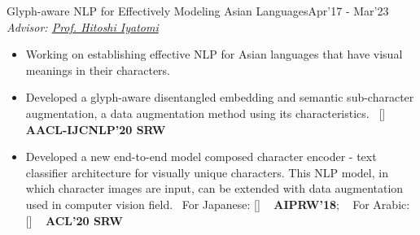 \begin{projects}
	\project
	{Glyph-aware NLP for Effectively Modeling Asian Languages}{Apr'17 - Mar'23}
	{
		\textit{Advisor:  \href{https://iyatomi-lab.info/english/people/2013-6-8}{Prof. Hitoshi Iyatomi}}
	}
	{\begin{itemize}
			\setlength\itemsep{0.3em}
			\item Working on establishing effective NLP for Asian languages that have visual meanings in their characters.
			\item Developed a glyph-aware disentangled embedding and semantic sub-character augmentation, a data augmentation method using its characteristics.~ [\href{https://github.com/IyatomiLab/GDCE-SSA}{\small{\githubSymbol}}] ~ {\small{\lbrack\textbf{{AACL-IJCNLP'20 SRW}}\rbrack}}
			\item Developed a new end-to-end model composed character encoder - text classifier architecture for visually unique characters. This NLP model, in which character images are input, can be extended with data augmentation used in computer vision field.~ For Japanese: [\href{https://github.com/IyatomiLab/CE-CLCNN}{\small{\githubSymbol}}] ~ {\small{\lbrack\textbf{{AIPRW'18}}\rbrack}}; ~ For Arabic: [\href{https://github.com/mahmouddaif/AraDIC}{\small{\githubSymbol}}] ~ {\small{\lbrack\textbf{{ACL'20 SRW}}\rbrack}}
		\end{itemize}}

\end{projects}

